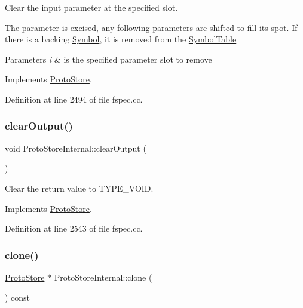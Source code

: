 Clear the input parameter at the specified slot. 

The parameter is excised, any following parameters are shifted to fill its spot. If there is a backing \mbox{\hyperlink{class_symbol}{Symbol}}, it is removed from the \mbox{\hyperlink{class_symbol_table}{Symbol\+Table}} 
\begin{DoxyParams}{Parameters}
{\em i} & is the specified parameter slot to remove \\
\hline
\end{DoxyParams}


Implements \mbox{\hyperlink{class_proto_store_afa6361ac313cdd2ccef1531209389cdc}{Proto\+Store}}.



Definition at line 2494 of file fspec.\+cc.

\mbox{\label{class_proto_store_internal_a8d17ecfc29c19b63b9d462462887017f}} 
\subsubsection{\texorpdfstring{clearOutput()}{clearOutput()}}
{\footnotesize\ttfamily void Proto\+Store\+Internal\+::clear\+Output (\begin{DoxyParamCaption}\item[{void}]{ }\end{DoxyParamCaption})\hspace{0.3cm}{\ttfamily [virtual]}}



Clear the return value to T\+Y\+P\+E\+\_\+\+V\+O\+ID. 



Implements \mbox{\hyperlink{class_proto_store_a02928f3bab6c98f728a1759e3127e5c4}{Proto\+Store}}.



Definition at line 2543 of file fspec.\+cc.

\mbox{\label{class_proto_store_internal_ac14aea73b6e7381a6751a1bcf98c1930}} 
\subsubsection{\texorpdfstring{clone()}{clone()}}
{\footnotesize\ttfamily \mbox{\hyperlink{class_proto_store}{Proto\+Store}} $\ast$ Proto\+Store\+Internal\+::clone (\begin{DoxyParamCaption}\item[{void}]{ }\end{DoxyParamCaption}) const\hspace{0.3cm}{\ttfamily [virtual]}}



